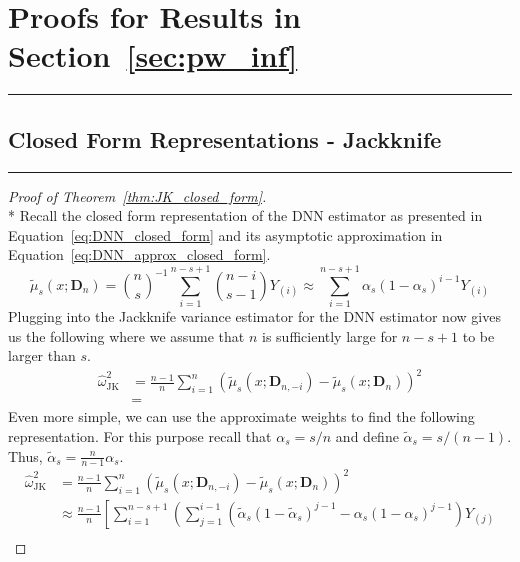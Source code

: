 \section{Proofs for Results in Section~\ref{sec:pw_inf}}
\hrule

\subsection{Closed Form Representations - Jackknife}
\hrule

\begin{proof}[Proof of Theorem~\ref{thm:JK_closed_form}]\mbox{}\\*
	Recall the closed form representation of the DNN estimator as presented in Equation~\ref{eq:DNN_closed_form} and its asymptotic approximation in Equation~\ref{eq:DNN_approx_closed_form}.
	\begin{equation}
		\tilde{\mu}_{s}(x; \mathbf{D}_n)
		= \binom{n}{s}^{-1} \sum_{i = 1}^{n - s + 1}\binom{n - i}{s - 1}Y_{(i)}
		\approx \sum_{i = 1}^{n - s + 1} \alpha_{s} {\left(1 - \alpha_{s}\right)}^{i - 1} Y_{(i)}
	\end{equation}
	Plugging into the Jackknife variance estimator for the DNN estimator now gives us the following where we assume that $n$ is sufficiently large for $n - s + 1$ to be larger than $s$.
	\begin{equation}
		\begin{aligned}
			\hat{\omega}_{\text{JK}}^{2}
			 & = \frac{n - 1}{n}\sum_{i = 1}^{n} {\left(\tilde{\mu}_{s}(x; \mathbf{D}_{n, -i}) - \tilde{\mu}_{s}(x; \mathbf{D}_n)\right)}^2 \\
			 & =
		\end{aligned}
	\end{equation}
	Even more simple, we can use the approximate weights to find the following representation.
	For this purpose recall that $\alpha_{s} = s/n$ and define $\tilde{\alpha}_s = s/(n-1)$.
	Thus, $\tilde{\alpha}_s = \frac{n}{n-1}\alpha_{s}$.
	\begin{equation}
		\begin{aligned}
			\hat{\omega}_{\text{JK}}^{2}
			 & = \frac{n - 1}{n}\sum_{i = 1}^{n} {\left(\tilde{\mu}_{s}(x; \mathbf{D}_{n, -i}) - \tilde{\mu}_{s}(x; \mathbf{D}_n)\right)}^2 \\
			 & \approx \frac{n - 1}{n} \left[
				\sum_{i = 1}^{n - s + 1} \left(
				\sum_{j = 1}^{i - 1}\left(\tilde{\alpha}_{s}{\left(1 - \tilde{\alpha}_{s}\right)}^{j - 1} - \alpha_{s}{\left(1 - \alpha_{s}\right)}^{j - 1}
				\right) Y_{(j)} \right. \right.\\

\end{aligned}
\end{equation}
\end{proof}
